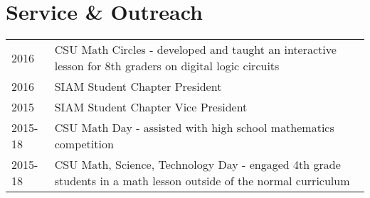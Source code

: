 \documentclass[letterpaper]{pine-resume} %
\begin{document}
\begin{minipage}[t]{0.66\textwidth}

\section{Service \& Outreach}

\begin{tabular}{p{1.5cm} p{11cm}}
2016 & CSU Math Circles - developed and taught an interactive lesson for 8th graders on digital logic circuits \\
2016 & SIAM Student Chapter President \\
2015 & SIAM Student Chapter Vice President \\
2015-18 & CSU Math Day - assisted with high school mathematics competition \\
2015-18 & CSU Math, Science, Technology Day - engaged 4th grade students in a math lesson outside of the normal curriculum \\
\end{tabular}

\sectionspace %

\end{minipage} %


\newpage %
\end{document}
